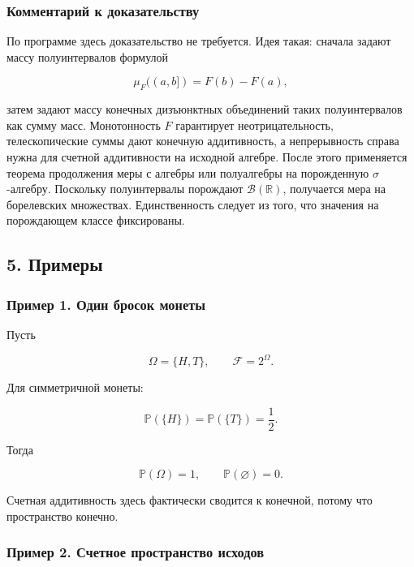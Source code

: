 \documentclass[
  11pt,
  a4paper,
]{article}
\begin{document}
\subsubsection{Комментарий к
доказательству}\label{ux43aux43eux43cux43cux435ux43dux442ux430ux440ux438ux439-ux43a-ux434ux43eux43aux430ux437ux430ux442ux435ux43bux44cux441ux442ux432ux443}

По программе здесь доказательство не требуется. Идея такая: сначала
задают массу полуинтервалов формулой

\[
\mu_F((a,b])=F(b)-F(a),
\]

затем задают массу конечных дизъюнктных объединений таких полуинтервалов
как сумму масс. Монотонность \(F\) гарантирует неотрицательность,
телескопические суммы дают конечную аддитивность, а непрерывность справа
нужна для счетной аддитивности на исходной алгебре. После этого
применяется теорема продолжения меры с алгебры или полуалгебры на
порожденную \(\sigma\)-алгебру. Поскольку полуинтервалы порождают
\(\mathcal B(\mathbb R)\), получается мера на борелевских множествах.
Единственность следует из того, что значения на порождающем классе
фиксированы.

\subsection{5. Примеры}\label{ux43fux440ux438ux43cux435ux440ux44b}

\subsubsection{Пример 1. Один бросок
монеты}\label{ux43fux440ux438ux43cux435ux440-1.-ux43eux434ux438ux43d-ux431ux440ux43eux441ux43eux43a-ux43cux43eux43dux435ux442ux44b}

Пусть

\[
\Omega=\{H,T\},\qquad
\mathcal F=2^\Omega.
\]

Для симметричной монеты:

\[
\mathbb P(\{H\})=\mathbb P(\{T\})=\frac12.
\]

Тогда

\[
\mathbb P(\Omega)=1,\qquad
\mathbb P(\varnothing)=0.
\]

Счетная аддитивность здесь фактически сводится к конечной, потому что
пространство конечно.

\subsubsection{Пример 2. Счетное пространство
исходов}\label{ux43fux440ux438ux43cux435ux440-2.-ux441ux447ux435ux442ux43dux43eux435-ux43fux440ux43eux441ux442ux440ux430ux43dux441ux442ux432ux43e-ux438ux441ux445ux43eux434ux43eux432}
\end{document}
